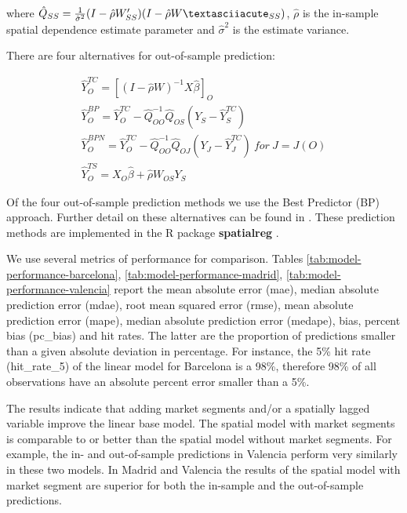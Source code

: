 \documentclass[Royal,times,sageh]{sagej}
\begin{document}
\noindent where
\({\hat Q_{SS}}={1 \over \hat \sigma^2}(I-\hat \rho {W'_{SS}})(I - \hat \rho W´_{SS})\),
\(\hat \rho\) is the in-sample spatial dependence estimate parameter and
\(\hat \sigma^2\) is the estimate variance.

There are four alternatives for out-of-sample prediction:

\begin{equation}
\begin{array}{llll}
\hat Y_O^{TC} = [(I-{\hat \rho W})^{-1} {X} \hat \beta]_O  \\[5pt]
\hat Y_O^{BP} = \hat Y_O^{TC} - \hat Q_{OO}^{-1}\hat Q_{OS}(Y_{S}-\hat Y_S^{TC}) \\[5pt]
\hat Y_O^{BPN} = \hat Y_O^{TC} - \hat Q_{OO}^{-1}\hat Q_{OJ}(Y_{J}-\hat Y_J^{TC}) \ for \ J=J(O) \\[5pt]
\hat Y_O^{TS} =X_O \hat \beta + \hat \rho W_{OS}Y_S
\end{array}
\end{equation}

Of the four out-of-sample prediction methods we use the Best Predictor
(BP) approach. Further detail on these alternatives can be found in
\citet{goulard2017}. These prediction methods are implemented in the R
package \textbf{spatialreg} \citep{bivand2013}.

We use several metrics of performance for comparison. Tables
\ref{tab:model-performance-barcelona},
\ref{tab:model-performance-madrid}, \ref{tab:model-performance-valencia}
report the mean absolute error (mae), median absolute prediction error
(mdae), root mean squared error (rmse), mean absolute prediction error
(mape), median absolute prediction error (medape), bias, percent bias
(pc\_bias) and hit rates. The latter are the proportion of predictions
smaller than a given absolute deviation in percentage. For instance, the
5\% hit rate (hit\_rate\_5) of the linear model for Barcelona is a 98\%,
therefore 98\% of all observations have an absolute percent error
smaller than a 5\%.

The results indicate that adding market segments and/or a spatially
lagged variable improve the linear base model. The spatial model with
market segments is comparable to or better than the spatial model
without market segments. For example, the in- and out-of-sample
predictions in Valencia perform very similarly in these two models. In
Madrid and Valencia the results of the spatial model with market segment
are superior for both the in-sample and the out-of-sample predictions.
\end{document}
